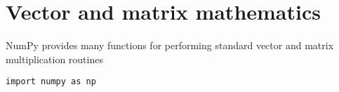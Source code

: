 \documentclass[numpymain.tex]{subfiles}
\begin{document}
\section{Vector and matrix mathematics }


NumPy provides many functions for performing standard vector and matrix multiplication routines

\begin{framed}
\begin{verbatim}
import numpy as np
\end{verbatim}
\end{framed}
\end{document}

